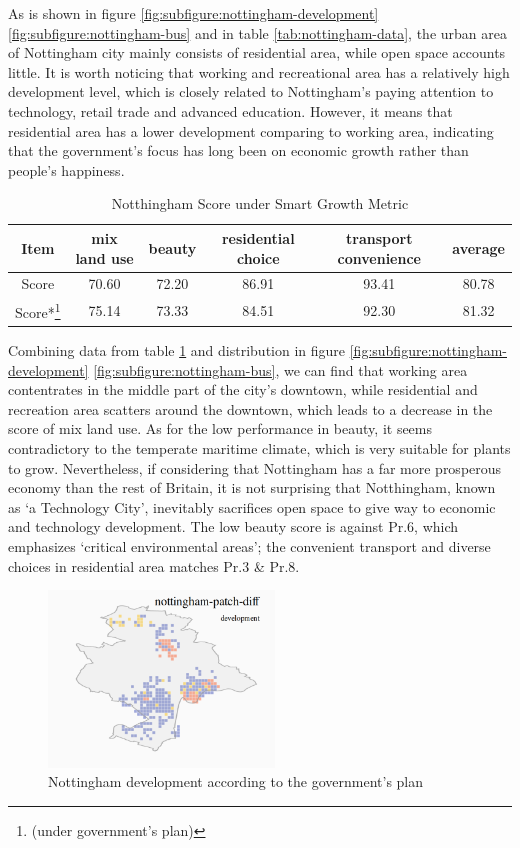 As is shown in figure \ref{fig:subfigure:nottingham-development} \ref{fig:subfigure:nottingham-bus} and in table \ref{tab:nottingham-data}, the urban area of Nottingham city mainly consists of residential area, while open space accounts little.
It is worth noticing that working and recreational area has a relatively high development level, which is closely related to Nottingham's paying attention to technology, retail trade and advanced education.
However, it means that residential area has a lower development comparing to working area, indicating that the government's focus has long been on economic growth rather than people's happiness.
\\
\begin{table}[tb]
\centering
  \begin{tabular}{c|cccc|c}
    \hline
    Item & mix land use & beauty & residential choice & transport convenience & average \\
    \hline
    Score & 70.60 & 72.20 & 86.91 & 93.41 & 80.78 \\
    Score*\footnote{(under government's plan)} & 75.14 & 73.33 & 84.51 & 92.30 & 81.32 \\
    \hline
  \end{tabular}
  \caption{Notthingham Score under Smart Growth Metric}
  \label{tab:nottingham-score}
\end{table}
Combining data from table \ref{tab:nottingham-score} and distribution in figure \ref{fig:subfigure:nottingham-development} \ref{fig:subfigure:nottingham-bus}, we can find that working area contentrates in the middle part of the city's downtown, while residential and recreation area scatters around the downtown, which leads to a decrease in the score of mix land use.
As for the low performance in beauty, it seems contradictory to the temperate maritime climate, which is very suitable for plants to grow.
Nevertheless, if considering that Nottingham has a far more prosperous economy than the rest of Britain, it is not surprising that Notthingham, known as `a Technology City', inevitably sacrifices open space to give way to economic and technology development.
The low beauty score is against Pr.6, which emphasizes `critical environmental areas';
the convenient transport and diverse choices in residential area matches Pr.3 \& Pr.8.
\\
\begin{figure}[htb]
  \label{fig:nottingham-patch-diff}
  \centering
  \includegraphics[width=6cm]{pic/nottingham-patch-diff-development.png}
  \caption{Nottingham development according to the government's plan}
\end{figure}
